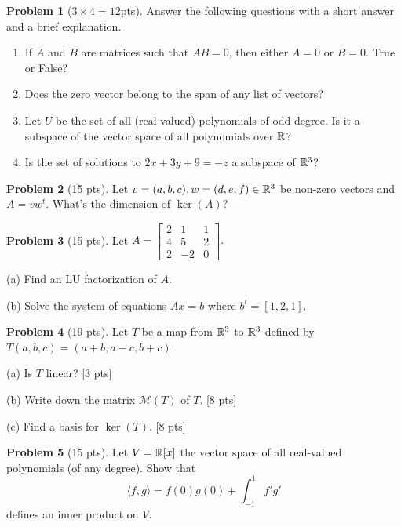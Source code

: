 \documentclass[12pt]{amsart}
\theoremstyle{definition}
\newtheorem{prob}{Problem}
\begin{document}
\begin{prob}[$3\times 4 = 12$pts]Answer the following questions with a short answer and a brief explanation.
	\begin{enumerate}
		\item If $A$ and $B$ are matrices such that $AB=0$, then either $A=0$ or $B=0$. True or False? \vspace{5cm}
		
		\item Does the zero vector belong to the span of any list of vectors? \vspace{5cm}
		
		\item Let $U$ be the set of all (real-valued) polynomials of odd degree. Is it a subspace of the vector space of all polynomials over $\mathbb{R}$?\vspace{5cm}
		\item Is the set of solutions to $2x+3y+9=-z$ a subspace of $\mathbb{R}^3$?	\end{enumerate}
\end{prob}

\newpage

\begin{prob}[15 pts]
	Let $v=(a,b,c),w=(d,e,f)\in\mathbb{R}^3$ be non-zero vectors and $A=vw^{t}$. What's the dimension of $\ker(A)$?
\end{prob}

\newpage

\begin{prob}[15 pts]
	Let $A=\left[ \begin{array}{cccc} 2 & 1 & 1  \\ 4 & 5 & 2  \\ 2 & -2  & 0 \end{array} \right] .$
	
	(a) Find an LU factorization of $A$. \vspace{10cm}
	
		
	(b) Solve the system of equations $Ax=b$ where $b^t=[1,2,1]$. 
	
	
\end{prob}

\newpage

\begin{prob}[19 pts]
Let $T$ be a map from $\mathbb{R}^3$ to $\mathbb{R}^3$ defined by $T(a,b,c)=(a+b,a-c,b+c)$.

(a) Is $T$ linear? [3 pts]\vspace{5cm}

(b) Write down the matrix $\mathcal{M}(T)$ of $T$. [8 pts]\vspace{8cm}

(c) Find a basis for $\ker(T)$. [8 pts]
	
\end{prob}
\newpage

\begin{prob}[15 pts]
	Let $V=\mathbb{R}[x]$ the vector space of all real-valued polynomials (of any degree). Show that $$\langle f,g\rangle =f(0)g(0) +\int_{-1}^{1}f'g'$$ 
	defines an inner product on $V$.
\end{prob}
\end{document}
